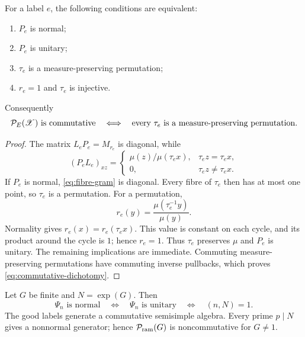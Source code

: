 \begin{theorem}
\label{thm:normality-commutativity}
For a label \(e\), the following conditions are equivalent:
\begin{enumerate}
\item \(P_e\) is normal;
\item \(P_e\) is unitary;
\item \(\tau_e\) is a measure-preserving permutation;
\item \(r_e=1\) and \(\tau_e\) is injective.
\end{enumerate}
Consequently
\begin{equation}
 \mathcal P_E(\mathscr X)\text{ is commutative}
 \quad\Longleftrightarrow\quad
 \text{every \(\tau_e\) is a measure-preserving permutation.}
 \label{eq:commutative-dichotomy}
\end{equation}
\end{theorem}

\begin{proof}
The matrix \(L_eP_e=M_{r_e}\) is diagonal, while
\begin{equation}
 (P_eL_e)_{xz}=
 \begin{cases}
 \mu(z)/\mu(\tau_ex),&\tau_ez=\tau_ex,\\
 0,&\tau_ez\neq\tau_ex.
 \end{cases}
 \label{eq:fibre-gram}
\end{equation}
If \(P_e\) is normal, \eqref{eq:fibre-gram} is diagonal.  Every fibre of
\(\tau_e\) then has at most one point, so \(\tau_e\) is a permutation.
For a permutation,
\[
 r_e(y)=\frac{\mu(\tau_e^{-1}y)}{\mu(y)}.
\]
Normality gives \(r_e(x)=r_e(\tau_ex)\).  This value is constant on each
cycle, and its product around the cycle is \(1\); hence \(r_e=1\).
Thus \(\tau_e\) preserves \(\mu\) and \(P_e\) is unitary.  The remaining
implications are immediate.  Commuting measure-preserving permutations
have commuting inverse pullbacks, which proves
\eqref{eq:commutative-dichotomy}.
\end{proof}

\begin{corollary}
\label{cor:group-normal-labels}
Let \(G\) be finite and \(N=\exp(G)\).  Then
\begin{equation}
 \Psi_n\text{ is normal}
 \quad\Longleftrightarrow\quad
 \Psi_n\text{ is unitary}
 \quad\Longleftrightarrow\quad
 (n,N)=1.
 \label{eq:good-normal-unitary}
\end{equation}
The good labels generate a commutative semisimple algebra.  Every prime
\(p\mid N\) gives a nonnormal generator; hence
\(\mathcal P_{\mathrm{ram}}(G)\) is noncommutative for \(G\neq1\).
\end{corollary}

